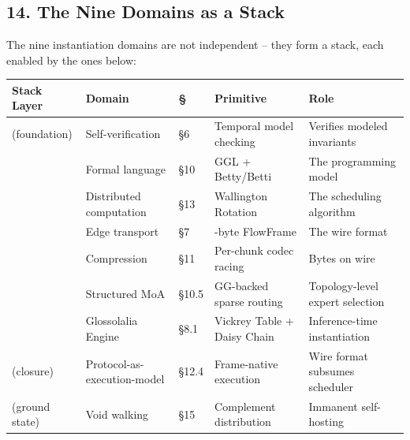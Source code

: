 \documentclass[
  11pt,
]{article}
\newcounter{none} %
\begin{document}
\subsection{14. The Nine Domains as a
Stack}\label{the-nine-domains-as-a-stack}

The nine instantiation domains are not independent -- they form a stack,
each enabled by the ones below:

{\def\LTcaptype{none} %
\begin{longtable}[]{@{}
  >{\raggedright\arraybackslash}p{}
  >{\raggedright\arraybackslash}p{}
  >{\raggedright\arraybackslash}p{}
  >{\raggedright\arraybackslash}p{}
  >{\raggedright\arraybackslash}p{}@{}}
\toprule\noalign{}
\begin{minipage}[b]{\linewidth}\raggedright
Stack Layer
\end{minipage} & \begin{minipage}[b]{\linewidth}\raggedright
Domain
\end{minipage} & \begin{minipage}[b]{\linewidth}\raggedright
§
\end{minipage} & \begin{minipage}[b]{\linewidth}\raggedright
Primitive
\end{minipage} & \begin{minipage}[b]{\linewidth}\raggedright
Role
\end{minipage} \\
\midrule\noalign{}
\endhead
\bottomrule\noalign{}
\endlastfoot
(foundation) & Self-verification & §6 & Temporal model checking &
Verifies modeled invariants \\
& Formal language & §10 & GGL + Betty/Betti & The programming model \\
& Distributed computation & §13 & Wallington Rotation & The scheduling
algorithm \\
& Edge transport & §7 & 10-byte FlowFrame & The wire format \\
& Compression & §11 & Per-chunk codec racing & Bytes on wire \\
& Structured MoA & §10.5 & GG-backed sparse routing & Topology-level
expert selection \\
& Glossolalia Engine & §8.1 & Vickrey Table + Daisy Chain &
Inference-time instantiation \\
(closure) & Protocol-as-execution-model & §12.4 & Frame-native execution
& Wire format subsumes scheduler \\
(ground state) & Void walking & §15 & Complement distribution & Immanent
self-hosting \\
\end{longtable}
}
\end{document}
